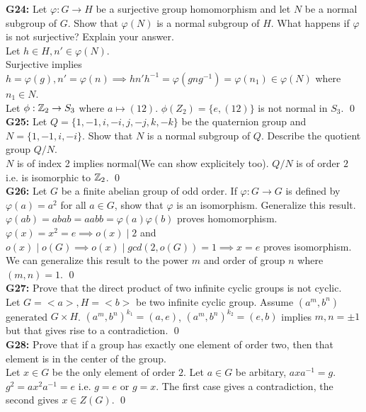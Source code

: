\textbf{G24:} Let $\varphi: G \rightarrow H$ be a surjective group homomorphism and let $N$ be a normal subgroup of $G$. Show that $\varphi(N)$ is a normal subgroup of $H$. What happens if $\varphi$ is not surjective? Explain your answer.\\
\soln
Let $ h\in H, n'\in \varphi(N) $. \\
Surjective implies $ h=\varphi(g), n'=\varphi(n) \implies hn'h^{-1}=\varphi(gng^{-1})=\varphi(n_1)\in \varphi(N)$ where $ n_1\in N $. \\
Let $ \phi:\mathbb{Z}_2\to S_3 $ where $ a\mapsto (12) $. $ \phi(Z_2)=\{e,(12)\} $ is not normal in $ S_3 $.
\qed\\

\textbf{G25:} Let $Q=\{1,-1, i,-i, j,-j, k,-k\}$ be the quaternion group and $N=\{1,-1, i,-i\}$. Show that $N$ is a normal subgroup of $Q$. Describe the quotient group $Q / N$.\\
\soln
$ N $ is of index 2 implies normal(We can show explicitely too). $ Q/N $ is of order $ 2 $ i.e. is isomorphic to $ \mathbb{Z}_2 $. 
\qed\\

\textbf{G26:} Let $G$ be a finite abelian group of odd order. If $\varphi: G \rightarrow G$ is defined by $\varphi(a)=a^{2}$ for all $a \in G$, show that $\varphi$ is an isomorphism. Generalize this result.\\
\soln
$ \varphi(ab)=abab=aabb=\varphi(a)\varphi(b) $ proves homomorphism.\\
$ \varphi(x)=x^2=e \implies o(x)\mid 2$ and $ o(x)\mid o(G) \implies o(x)\mid gcd(2,o(G))=1 \implies x=e $ proves isomorphism. \\
We can generalize this result to the power $ m $ and order of group $ n $ where $ (m,n)=1 $.
\qed\\

\textbf{G27:} Prove that the direct product of two infinite cyclic groups is not cyclic.\\

\soln
Let $ G =<a>,H=<b>$ be two infinite cyclic group. Assume $ (a^m,b^n) $ generated $ G\times H $. $ (a^m,b^n)^{k_1}= (a,e) $, $ (a^m,b^n)^{k_2}= (e,b) $ implies $ m,n=\pm 1 $ but that gives rise to a contradiction.
\qed\\

\textbf{G28:} Prove that if a group has exactly one element of order two, then that element is in the center of the group.\\
\soln
Let $ x \in G$ be the only element of order $ 2 $. Let $ a\in G $ be arbitary,  $ axa^{-1}= g $. $ g^2 = ax^2a^{-1}=e $ i.e. $ g=e $ or $ g=x $. The first case gives a contradiction, the second gives $ x\in Z(G) $.
\qed\\

